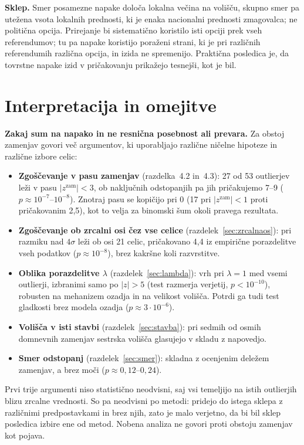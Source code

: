 \documentclass[11pt,a4paper]{article}
\begin{document}
\textbf{Sklep.} Smer posamezne napake določa lokalna večina na volišču, skupno smer pa utežena vsota lokalnih prednosti, ki je enaka nacionalni prednosti zmagovalca; ne politična opcija. Prirejanje bi sistematično koristilo isti opciji prek vseh referendumov; tu pa napake koristijo poraženi strani, ki je pri različnih referendumih različna opcija, in izida ne spremenijo. Praktična posledica je, da tovrstne napake izid v pričakovanju prikažejo tesnejši, kot je bil.

\section{Interpretacija in omejitve}

\textbf{Zakaj sum na napako in ne resnična posebnost ali prevara.} Za obstoj zamenjav govori več argumentov, ki uporabljajo različne ničelne hipoteze in različne izbore celic:
\begin{itemize}
\item \textbf{Zgoščevanje v pasu zamenjav} (razdelka~4.2 in~4.3): 27 od 53 outlierjev leži v pasu $|z^{\text{zam}}|<3$, ob naključnih odstopanjih pa jih pričakujemo 7--9 ($p\approx10^{-7}$--$10^{-8}$). Znotraj pasu se kopičijo pri 0 (17 pri $|z^{\text{zam}}|<1$ proti pričakovanim 2,5), kot to velja za binomski šum okoli pravega rezultata.
\item \textbf{Zgoščevanje ob zrcalni osi čez vse celice} (razdelek~\ref{sec:zrcalnaos}): pri razmiku nad $4\sigma$ leži ob osi 21 celic, pričakovano 4,4 iz empirične porazdelitve vseh podatkov ($p\approx10^{-8}$), brez kakršne koli razvrstitve.
\item \textbf{Oblika porazdelitve $\lambda$} (razdelek~\ref{sec:lambda}): vrh pri $\lambda=1$ med vsemi outlierji, izbranimi samo po $|z|>5$ (test razmerja verjetij, $p<10^{-10}$), robusten na mehanizem ozadja in na velikost volišča. Potrdi ga tudi test gladkosti brez modela ozadja ($p\approx3\cdot10^{-6}$).
\item \textbf{Volišča v isti stavbi} (razdelek~\ref{sec:stavba}): pri sedmih od osmih domnevnih zamenjav sestrska volišča glasujejo v skladu z napovedjo.
\item \textbf{Smer odstopanj} (razdelek~\ref{sec:smer}): skladna z ocenjenim deležem zamenjav, a brez moči ($p\approx0{,}12$--$0{,}24$).
\end{itemize}
Prvi trije argumenti niso statistično neodvisni, saj vsi temeljijo na istih outlierjih blizu zrcalne vrednosti. So pa neodvisni po metodi: pridejo do istega sklepa z različnimi predpostavkami in brez njih, zato je malo verjetno, da bi bil sklep posledica izbire ene od metod. Nobena analiza ne govori proti obstoju zamenjav kot pojava.
\end{document}
